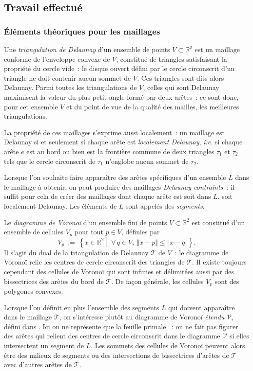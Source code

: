 \documentclass[12pt,a4paper]{report}
\begin{document}
\subsection{Travail effectué}

\subsubsection{\'Eléments théoriques pour les maillages}

Une \emph{triangulation de Delaunay} d'un ensemble de points $V\subset\mathbb{R}^2$ est un maillage conforme de l'enveloppe convexe de $V$, constitué de triangles satisfaisant la propriété du cercle vide~: le disque ouvert défini par le cercle circonscrit d'un triangle ne doit contenir aucun sommet de $V$. Ces triangles sont dits alors Delaunay. Parmi toutes les triangulations de $V$, celles qui sont Delaunay maximisent la valeur du plus petit angle formé par deux arêtes~: ce sont donc, pour cet ensemble $V$ et du point de vue de la qualité des mailles, les \og meilleures \fg{} triangulations.

La propriété de ces maillages s'exprime aussi localement~: un maillage est Delaunay si et seulement si chaque arête est \emph{localement Delaunay}, \emph{i.e.} si chaque arête $e$ est au bord ou bien est la frontière commune de deux triangles $\tau_1$ et $\tau_2$ tels que le cercle circonscrit de $\tau_1$ n'englobe aucun sommet de $\tau_2$.

Lorsque l'on souhaite faire apparaître des arêtes spécifiques d'un ensemble $L$ dans le maillage à obtenir, on peut produire des maillages \emph{Delaunay contraints}~: il suffit pour cela de créer des maillages dont chaque arête est soit dans $L$, soit localement Delaunay. Les éléments de $L$ sont appelés des \emph{segments}.


Le \emph{diagramme de Voronoï} d'un ensemble fini de points $V\subset\mathbb{R}^2$ est constitué d'un ensemble de cellules $V_p$ pour tout $p\in V$, définies par
\[V_p\ :=\ \left\{x\in\mathbb{R}^2\middle\vert\ \forall\,q\in V,\ \Vert x-p\Vert\leqslant\Vert x-q\Vert\right\}\text{.}\]
Il s'agit du dual de la triangulation de Delaunay $\mathcal{T}$ de $V$~: le diagramme de Voronoï relie les centres de cercle circonscrit des triangles de $\mathcal{T}$. Il existe toujours cependant des cellules de Voronoï qui sont infinies et délimitées aussi par des bissectrices des arêtes du bord de $\mathcal{T}$. De façon générale, les cellules $V_p$ sont des polygones convexes.

Lorsque l'on définit en plus l'ensemble des segments $L$ qui doivent apparaître dans le maillage $\mathcal{T}$, on s'intéresse plutôt au diagramme de Voronoï \emph{étendu} $\mathcal{V}$, défini dans \cite[pages 30-31]{Edelsbrunner}. Ici on ne représente que la \og feuille primale \fg{}~: on ne fait pas figurer des arêtes qui relient des centres de cercle circonscrit dans le diagramme $\mathcal{V}$ si elles intersectent un segment de $L$. Les sommets des cellules de Voronoï peuvent alors être des milieux de segments ou des intersections de bissectrices d'arêtes de $\mathcal{T}$ avec d'autres arêtes de $\mathcal{T}$.
\end{document}
